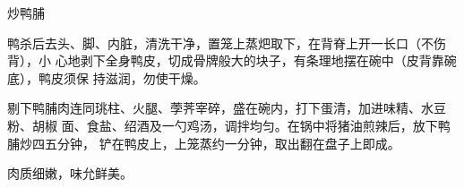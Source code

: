 %
%
%
%
%
%
%
\begin{recipe}{炒鸭脯}

\ingredients


\preparation

鸭杀后去头、脚、内脏，清洗干净，置笼上蒸𤆵取下，在背脊上开一长口（不伤背），小
心地剥下全身鸭皮，切成骨牌般大的块子，有条理地摆在碗中（皮背靠碗底），鸭皮须保
持滋润，勿使干燥。

剔下鸭脯肉连同珧柱、火腿、荸荠宰碎，盛在碗内，打下蛋清，加进味精、水豆粉、胡椒
面、食盐、绍酒及一勺鸡汤，调拌均匀。在锅中将猪油煎辣后，放下鸭脯炒四五分钟，
铲在鸭皮上，上笼蒸约一分钟，取出翻在盘子上即成。

\features

肉质细嫩，味允鲜美。

\end{recipe}

